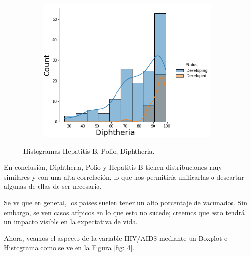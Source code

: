 \begin{itemize}
\begin{figure}[H]
                \hfill
                \begin{subfigure}{0.3\linewidth}
                \centering
                \includegraphics[width=\textwidth]{img/5.png}
              \end{subfigure}
               \caption{Histogramas Hepatitis B, Polio, Diphtheria.}
               \label{fig:3}
        \end{figure}

         En conclusión, Diphtheria, Polio y Hepatitis B tienen distribuciones muy similares y con una alta correlación, lo que nos permitiría unificarlas o descartar algunas de ellas de ser necesario.
         
         
         Se ve que en general, los países suelen tener un alto porcentaje de vacunados. Sin embargo, se ven casos atípicos en lo que esto no sucede; creemos que esto tendrá un impacto visible en la expectativa de vida.   
         
        Ahora, veamos el aspecto de la variable HIV/AIDS mediante un Boxplot e Histograma como se ve en la Figura \ref{fig: 4}.    
        

\end{itemize}
